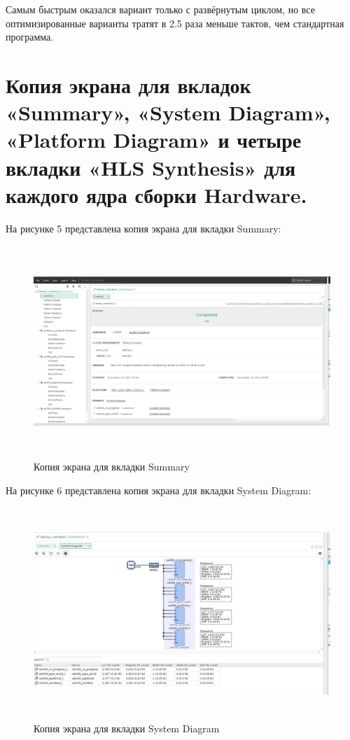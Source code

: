 Самым быстрым оказался вариант только с развёрнутым циклом, но все оптимизированные варианты тратят в 2.5 раза меньше тактов, чем стандартная программа.

\section*{Копия экрана для вкладок «Summary», \newline «System Diagram», «Platform Diagram» и четыре вкладки «HLS Synthesis» для каждого ядра \newline сборки Hardware.}

На рисунке 5 представлена копия экрана для вкладки Summary:

\FloatBarrier
\begin{figure}[h]
	\begin{center}
		\includegraphics[width=\linewidth, height=8cm]{inc/summary.png}
	\end{center}
	\caption{Копия экрана для вкладки Summary}
\end{figure}
\FloatBarrier

На рисунке 6 представлена копия экрана для вкладки System Diagram:

\FloatBarrier
\begin{figure}[h]
	\begin{center}
		\includegraphics[width=\linewidth, height=8cm]{inc/sysdig.png}
	\end{center}
	\caption{Копия экрана для вкладки System Diagram}
\end{figure}
\FloatBarrier


